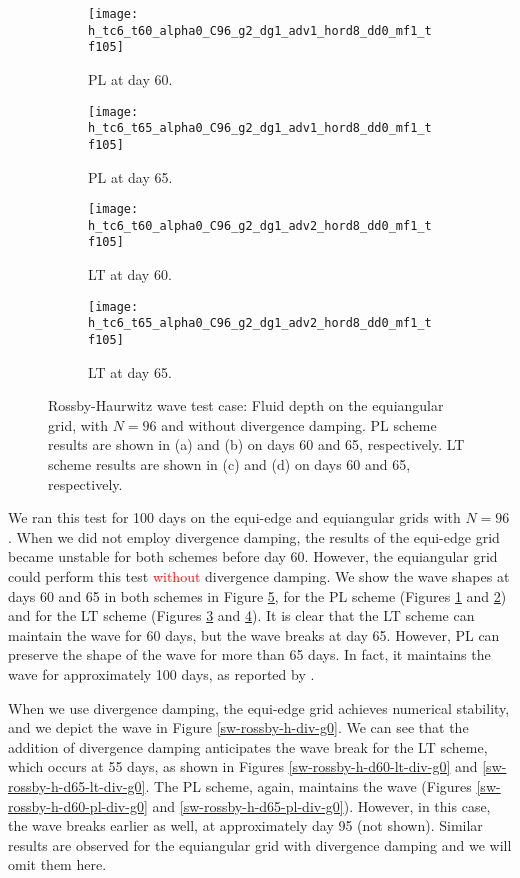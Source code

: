 \begin{figure}[!h]
	\centering
	\begin{subfigure}{0.49\textwidth}
		\centering
		\texttt{[image: h\_tc6\_t60\_alpha0\_C96\_g2\_dg1\_adv1\_hord8\_dd0\_mf1\_tf105]}
		\caption{PL at day 60.\label{sw-rossby-h-d60-pl}}
	\end{subfigure}
	\begin{subfigure}{0.49\textwidth}
		\centering
		\texttt{[image: h\_tc6\_t65\_alpha0\_C96\_g2\_dg1\_adv1\_hord8\_dd0\_mf1\_tf105]}
		\caption{PL at day 65.\label{sw-rossby-h-d65-pl}}
	\end{subfigure}
	
	\begin{subfigure}{0.49\textwidth}
		\centering
		\texttt{[image: h\_tc6\_t60\_alpha0\_C96\_g2\_dg1\_adv2\_hord8\_dd0\_mf1\_tf105]}
		\caption{LT at day 60.\label{sw-rossby-h-d60-lt}}
	\end{subfigure}
	\begin{subfigure}{0.49\textwidth}
		\centering
		\texttt{[image: h\_tc6\_t65\_alpha0\_C96\_g2\_dg1\_adv2\_hord8\_dd0\_mf1\_tf105]}
		\caption{LT at day 65.\label{sw-rossby-h-d65-lt}}
	\end{subfigure}
	\caption{Rossby-Haurwitz wave test case:
		Fluid depth on the equiangular grid, with $N=96$ and without divergence damping.
		PL scheme results are shown in (a) and (b) on days 60 and 65, respectively.
		LT scheme results are shown in (c) and (d) on days 60 and 65, respectively.
		\label{sw-rossby-h}}
\end{figure}
We ran this test for 100 days on the equi-edge and equiangular grids with $N=96$.
When we did not employ divergence damping, the results of the equi-edge grid became unstable for both schemes before day 60.
However, the equiangular grid could perform this test \textcolor{red}{without} divergence damping.
We show the wave shapes at days 60 and 65 in both schemes in Figure \ref{sw-rossby-h}, 
for the PL scheme (Figures \ref{sw-rossby-h-d60-pl} and \ref{sw-rossby-h-d65-pl}) and 
for the LT scheme (Figures \ref{sw-rossby-h-d60-lt} and \ref{sw-rossby-h-d65-lt}).
It is clear that the LT scheme can maintain the wave for 60 days, but the wave breaks at day 65. 
However, PL can preserve the shape of the wave for more than 65 days. 
In fact, it maintains the wave for approximately 100 days, as reported by \citet{mouallem:2023}.

When we use divergence damping, the equi-edge grid achieves numerical stability,
and we depict the wave in Figure \ref{sw-rossby-h-div-g0}.
We can see that the addition of divergence damping anticipates the wave break for the LT scheme,
which occurs at 55 days, as shown in Figures \ref{sw-rossby-h-d60-lt-div-g0} and \ref{sw-rossby-h-d65-lt-div-g0}. 
The PL scheme, again, maintains the wave (Figures \ref{sw-rossby-h-d60-pl-div-g0} and \ref{sw-rossby-h-d65-pl-div-g0}).
However, in this case, the wave breaks earlier as well, at approximately day 95 (not shown).
Similar results are observed for the equiangular grid with divergence damping and we will omit them here.

